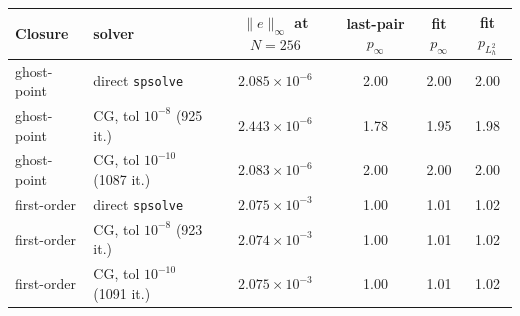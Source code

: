 \begin{tabular}{@{}llcccc@{}}\toprule
Closure & solver & $\|e\|_\infty$ at $N=256$ & last-pair $p_\infty$ & fit $p_\infty$ & fit $p_{L^2_h}$\\\midrule
ghost-point & direct \texttt{spsolve} & $2.085\times10^{-6}$ & 2.00 & 2.00 & 2.00\\
ghost-point & CG, tol $10^{-8}$ (925 it.) & $2.443\times10^{-6}$ & 1.78 & 1.95 & 1.98\\
ghost-point & CG, tol $10^{-10}$ (1087 it.) & $2.083\times10^{-6}$ & 2.00 & 2.00 & 2.00\\
\midrule
first-order & direct \texttt{spsolve} & $2.075\times10^{-3}$ & 1.00 & 1.01 & 1.02\\
first-order & CG, tol $10^{-8}$ (923 it.) & $2.074\times10^{-3}$ & 1.00 & 1.01 & 1.02\\
first-order & CG, tol $10^{-10}$ (1091 it.) & $2.075\times10^{-3}$ & 1.00 & 1.01 & 1.02\\
\bottomrule
\end{tabular}
